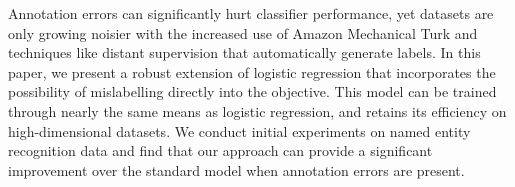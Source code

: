 Annotation errors can significantly hurt classifier performance, yet datasets are only growing noisier with the increased use of Amazon Mechanical Turk and techniques like distant supervision that automatically generate labels. In this paper, we present a robust extension of logistic regression that incorporates the possibility of mislabelling directly into the objective. This model can be trained through nearly the same means as logistic regression, and retains its efficiency on high-dimensional datasets. We conduct initial experiments on named entity recognition data and find that our approach can provide a significant improvement over the standard model when annotation errors are present.
